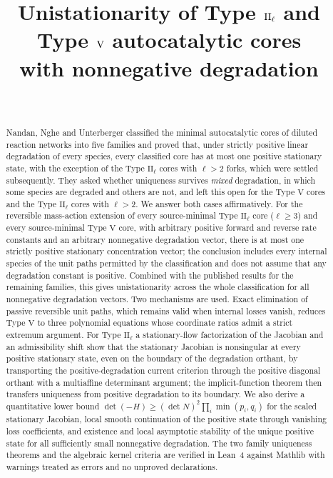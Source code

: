 \documentclass[11pt,a4paper]{article}
\title{Unistationarity of Type $\II_\ell$ and Type $\V$ autocatalytic cores\\ with nonnegative degradation}
\author{\PaperAuthor\\ \PaperAffiliation}
\date{\PaperDate}
\theoremstyle{plain}
\theoremstyle{definition}
\theoremstyle{remark}
\numberwithin{equation}{section}
\newcommand{\II}{\mathrm{II}}
\newcommand{\V}{\mathrm{V}}
\begin{document}
\maketitle

\begin{abstract}
Nandan, Nghe and Unterberger classified the minimal autocatalytic cores of diluted reaction networks into five families and proved that, under strictly positive linear degradation of every species, every classified core has at most one positive stationary state, with the exception of the Type $\II_\ell$ cores with $\ell>2$ forks, which were settled subsequently. They asked whether uniqueness survives \emph{mixed} degradation, in which some species are degraded and others are not, and left this open for the Type $\V$ cores and the Type $\II_\ell$ cores with $\ell>2$. We answer both cases affirmatively. For the reversible mass-action extension of every source-minimal Type $\II_\ell$ core ($\ell\ge3$) and every source-minimal Type $\V$ core, with arbitrary positive forward and reverse rate constants and an arbitrary nonnegative degradation vector, there is at most one strictly positive stationary concentration vector; the conclusion includes every internal species of the unit paths permitted by the classification and does not assume that any degradation constant is positive. Combined with the published results for the remaining families, this gives unistationarity across the whole classification for all nonnegative degradation vectors. Two mechanisms are used. Exact elimination of passive reversible unit paths, which remains valid when internal losses vanish, reduces Type $\V$ to three polynomial equations whose coordinate ratios admit a strict extremum argument. For Type $\II_\ell$ a stationary-flow factorization of the Jacobian and an admissibility shift show that the stationary Jacobian is nonsingular at every positive stationary state, even on the boundary of the degradation orthant, by transporting the positive-degradation current criterion through the positive diagonal orthant with a multiaffine determinant argument; the implicit-function theorem then transfers uniqueness from positive degradation to its boundary. We also derive a quantitative lower bound $\det(-H)\ge(\det N)^2\prod_i\min(p_i,q_i)$ for the scaled stationary Jacobian, local smooth continuation of the positive state through vanishing loss coefficients, and existence and local asymptotic stability of the unique positive state for all sufficiently small nonnegative degradation. The two family uniqueness theorems and the algebraic kernel criteria are verified in Lean~4 against Mathlib with warnings treated as errors and no unproved declarations.
\end{abstract}
\end{document}
